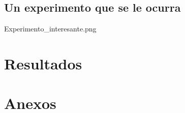 \documentclass[journal]{IEEEtran}
\begin{document}
\subsection{Un experimento que se le ocurra}
    Experimento\_interesante.png

\section{Resultados}






\section*{Anexos}

    
\end{document}
